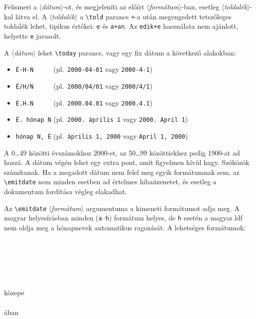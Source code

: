 \documentclass[12pt]{article}
\newcommand\param[1]{{\normalfont\slshape$\langle$#1$\rangle$}}
\begin{document}
\begin{latexcode}
\emitdate[(*\param{toldalék}*)]{(*\param{formátum}*)}{(*\param{dátum}*)}
\end{latexcode}
Felismeri a \param{dátum}-ot, és megjeleníti az előírt \param{formátum}-ban, esetleg \param{toldalék}-kal látva el.
A \param{toldalék} a \verb|\told| parancs \texttt{+}-a után megengedett tetszőleges toldalék lehet, tipikus értékei: \texttt{e} és \texttt{a+an}.
Az \texttt{edik+e} használata nem ajánlott, helyette \texttt{e} javasolt.

A \param{dátum} lehet \verb|\today| parancs, vagy egy fix dátum a következő alakokban:
\begin{itemize}[noitemsep,label=]
\item \verb|É-H-N     | (pl.~\texttt{2000-04-01} vagy \texttt{2000-4-1})
\item \verb|É/H/N     | (pl.~\texttt{2000/04/01} vagy \texttt{2000/4/1})
\item \verb|É.H.N     | (pl.~\texttt{2000.04.01} vagy \texttt{2000.4.1})
\item \verb|É. hónap N| (pl.~\texttt{2000. április 1} vagy \texttt{2000. April 1})
\item \verb|hónap N, É| (pl.~\texttt{április 1, 2000} vagy \texttt{April 1, 2000})
\end{itemize}

A 0\dots49 közötti évszámokhoz 2000-et, az 50\dots99 közöttiekhez pedig 1900-at ad hozzá.
A dátum végén lehet egy extra pont, amit figyelmen kívül hagy.
Szóközök számítanak.
Ha a megadott dátum nem felel meg egyik formátumnak sem, az \verb|\emitdate| nem minden esetben ad értelmes hibaüzenetet, és esetleg a dokumentum fordítása végleg elakadhat.

Az \verb|\emitdate| \param{formátum} argumentuma a kimeneti formátumot adja meg.
A magyar helyesírásban minden (\texttt{a}--\texttt{h}) formátum helyes, de \texttt{h} esetén a \textsf{magyar.ldf} nem oldja meg a hónapnevek automatikus ragozását.
A lehetséges formátumok:

\begin{latexexample}
\\
\\
\\
\\
\\
 közepe\\
\\
ában
\end{latexexample}
\end{document}
